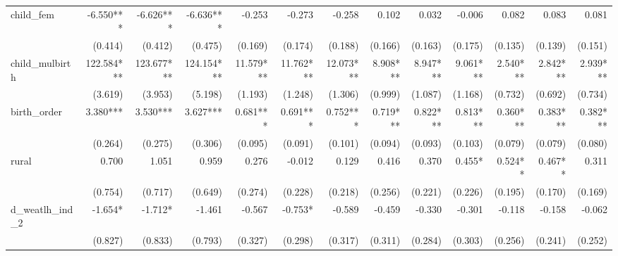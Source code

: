 \begin{tabular}{lrrrrrrrrrrrr}
child\_fem                                  &    -6.550*** &    -6.626*** &    -6.636*** &       -0.253 &       -0.273 &       -0.258 &        0.102 &        0.032 &       -0.006 &        0.082 &        0.083 &        0.081 \\ 
                                            &      (0.414) &      (0.412) &      (0.475) &      (0.169) &      (0.174) &      (0.188) &      (0.166) &      (0.163) &      (0.175) &      (0.135) &      (0.139) &      (0.151) \\ 
child\_mulbirth                             &   122.584*** &   123.677*** &   124.154*** &    11.579*** &    11.762*** &    12.073*** &     8.908*** &     8.947*** &     9.061*** &     2.540*** &     2.842*** &     2.939*** \\ 
                                            &      (3.619) &      (3.953) &      (5.198) &      (1.193) &      (1.248) &      (1.306) &      (0.999) &      (1.087) &      (1.168) &      (0.732) &      (0.692) &      (0.734) \\ 
birth\_order                                &     3.380*** &     3.530*** &     3.627*** &     0.681*** &     0.691*** &     0.752*** &     0.719*** &     0.822*** &     0.813*** &     0.360*** &     0.383*** &     0.382*** \\ 
                                            &      (0.264) &      (0.275) &      (0.306) &      (0.095) &      (0.091) &      (0.101) &      (0.094) &      (0.093) &      (0.103) &      (0.079) &      (0.079) &      (0.080) \\ 
rural                                       &        0.700 &        1.051 &        0.959 &        0.276 &       -0.012 &        0.129 &        0.416 &        0.370 &       0.455* &      0.524** &      0.467** &        0.311 \\ 
                                            &      (0.754) &      (0.717) &      (0.649) &      (0.274) &      (0.228) &      (0.218) &      (0.256) &      (0.221) &      (0.226) &      (0.195) &      (0.170) &      (0.169) \\ 
d\_weatlh\_ind\_2                           &      -1.654* &      -1.712* &       -1.461 &       -0.567 &      -0.753* &       -0.589 &       -0.459 &       -0.330 &       -0.301 &       -0.118 &       -0.158 &       -0.062 \\ 
                                            &      (0.827) &      (0.833) &      (0.793) &      (0.327) &      (0.298) &      (0.317) &      (0.311) &      (0.284) &      (0.303) &      (0.256) &      (0.241) &      (0.252) \\ 

\end{tabular}
